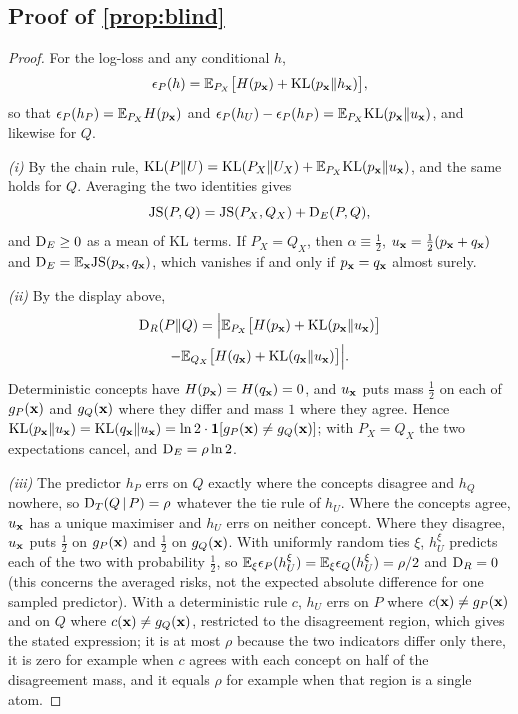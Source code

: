 \documentclass[11pt]{article}
\theoremstyle{plain}
\theoremstyle{definition}
\theoremstyle{remark}
\begin{document}
\subsection{Proof of \texorpdfstring{\cref{prop:blind}}{Proposition 1}}

\begin{proof}
For the log-loss and any conditional $h$,
\[
  \epsilon_P(h)=\mathbb{E}_{P_X}\bigl[H(p_{\mathbf{x}})+\mathrm{KL}(p_{\mathbf{x}}\|h_{\mathbf{x}})\bigr],
\]
so that $\epsilon_P(h_P)=\mathbb{E}_{P_X}H(p_{\mathbf{x}})$ and $\epsilon_P(h_U)-\epsilon_P(h_P)=\mathbb{E}_{P_X}\mathrm{KL}(p_{\mathbf{x}}\|u_{\mathbf{x}})$, and likewise
for $Q$.

\emph{(i)} By the chain rule, $\mathrm{KL}(P\|U)=\mathrm{KL}(P_X\|U_X)+\mathbb{E}_{P_X}\mathrm{KL}(p_{\mathbf{x}}\|u_{\mathbf{x}})$, and the same holds for $Q$.
Averaging the two identities gives
\[
  \mathrm{JS}(P,Q)=\mathrm{JS}(P_X,Q_X)+\mathrm{D}_E(P,Q),
\]
and $\mathrm{D}_E\ge0$ as a mean of KL terms. If $P_X=Q_X$, then $\alpha\equiv\tfrac12$, $u_{\mathbf{x}}=\tfrac12(p_{\mathbf{x}}+q_{\mathbf{x}})$ and
$\mathrm{D}_E=\mathbb{E}_{\mathbf{x}}\mathrm{JS}(p_{\mathbf{x}},q_{\mathbf{x}})$, which vanishes if and only if $p_{\mathbf{x}}=q_{\mathbf{x}}$ almost surely.

\emph{(ii)} By the display above,
\begin{multline*}
  \mathrm{D}_R(P\|Q)=\Bigl|\mathbb{E}_{P_X}\bigl[H(p_{\mathbf{x}})+\mathrm{KL}(p_{\mathbf{x}}\|u_{\mathbf{x}})\bigr]\\
  -\mathbb{E}_{Q_X}\bigl[H(q_{\mathbf{x}})+\mathrm{KL}(q_{\mathbf{x}}\|u_{\mathbf{x}})\bigr]\Bigr| .
\end{multline*}
Deterministic concepts have $H(p_{\mathbf{x}})=H(q_{\mathbf{x}})=0$, and $u_{\mathbf{x}}$ puts mass $\tfrac12$ on each of $g_P(\mathbf{x})$ and
$g_Q(\mathbf{x})$ where they differ and mass $1$ where they agree. Hence
$\mathrm{KL}(p_{\mathbf{x}}\|u_{\mathbf{x}})=\mathrm{KL}(q_{\mathbf{x}}\|u_{\mathbf{x}})=\ln2\cdot\mathbf 1[g_P(\mathbf{x})\neq g_Q(\mathbf{x})]$; with $P_X=Q_X$ the two expectations
cancel, and $\mathrm{D}_E=\rho\ln2$.

\emph{(iii)} The predictor $h_P$ errs on $Q$ exactly where the concepts disagree and $h_Q$ nowhere, so
$\mathrm{D}_T(Q\,|\,P)=\rho$ whatever the tie rule of $h_U$. Where the concepts agree, $u_{\mathbf{x}}$ has a unique maximiser and
$h_U$ errs on neither concept. Where they disagree, $u_{\mathbf{x}}$ puts $\tfrac12$ on $g_P(\mathbf{x})$ and $\tfrac12$ on $g_Q(\mathbf{x})$.
With uniformly random ties $\xi$, $h_U^\xi$ predicts each of the two with probability $\tfrac12$, so
$\mathbb{E}_\xi\epsilon_P(h_U^\xi)=\mathbb{E}_\xi\epsilon_Q(h_U^\xi)=\rho/2$ and $\mathrm{D}_R=0$ (this concerns the averaged risks, not
the expected absolute difference for one sampled predictor). With a deterministic rule $c$, $h_U$ errs on $P$ where
$c(\mathbf{x})\ne g_P(\mathbf{x})$ and on $Q$ where $c(\mathbf{x})\ne g_Q(\mathbf{x})$, restricted to the disagreement region, which gives the
stated expression; it is at most $\rho$ because the two indicators differ only there, it is zero for example when
$c$ agrees with each concept on half of the disagreement mass, and it equals $\rho$ for example when that region is a
single atom.
\end{proof}
\end{document}
